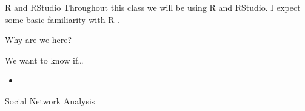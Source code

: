 \documentclass[]{beamer}
\begin{document}
\begin{frame}{R and RStudio}
Throughout this class we will be using R and RStudio. I expect some basic familiarity with R .

\end{frame}

\begin{frame}{Why are we here?}

We want to know if\ldots \pause 
\begin{itemize}
	\item 
\end{itemize}

\end{frame}

\begin{frame}{Social Network Analysis} 


\end{frame}
\end{document}
